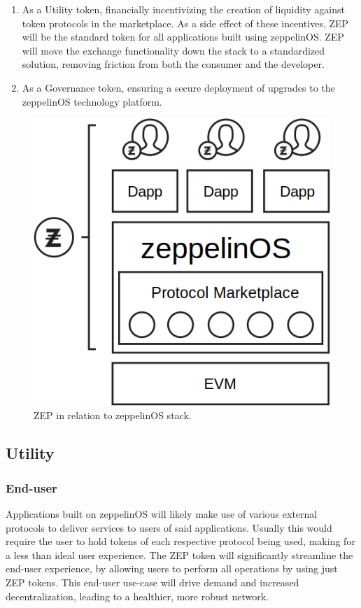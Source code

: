 \documentclass[]{article}
\makeatletter
\DeclareRobustCommand{\_}{%
  \leavevmode\vbox{%
    \hrule\@width.5em
          \@height-.26ex
          \@depth\dimexpr.26ex+.28pt\relax}}
\makeatother
\begin{document}
\begin{enumerate}

  \item
    As a Utility token, financially incentivizing the creation of
    liquidity against token protocols in the marketplace. As a side
    effect of these incentives, ZEP will be the standard token for all
    applications built using zeppelinOS. ZEP will move the exchange
    functionality down the stack to a standardized solution, removing
    friction from both the consumer and the developer.

  \item
    As a Governance token, ensuring a secure deployment of upgrades to
    the zeppelinOS technology platform.

\end{enumerate}

\begin{figure}
  \centering
  \includegraphics[width=0.4\linewidth]{images/image5}
  \caption{ZEP in relation to zeppelinOS stack.}
\end{figure}

\subsection{Utility}

\subsubsection{End-user}

Applications built on zeppelinOS will likely make use of various
external protocols to deliver services to users of said applications.
Usually this would require the user to hold tokens of each respective
protocol being used, making for a less than ideal user experience. The
ZEP token will significantly streamline the end-user experience, by
allowing users to perform all operations by using just ZEP tokens.
This end-user use-case will drive demand and increased
decentralization, leading to a healthier, more robust network.
\end{document}

